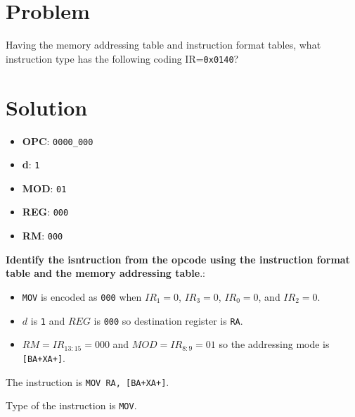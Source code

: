 \section*{Problem}
Having the memory addressing table and instruction format tables, what instruction type has the following coding IR=\texttt{0x0140}?

\section*{Solution}


\begin{itemize}
    \item \textbf{OPC}: \texttt{0000\_000}
    \item \textbf{d}: \texttt{1}
    \item \textbf{MOD}: \texttt{01}
    \item \textbf{REG}: \texttt{000}
    \item \textbf{RM}: \texttt{000}
\end{itemize}


\textbf{Identify the isntruction from the opcode using the instruction format table and the memory addressing table}.:
\begin{itemize}
    \item \texttt{MOV} is encoded as \texttt{000} when $IR_{1}=0$, $IR_{3}=0$, $IR_{0}=0$, and $IR_{2}=0$.
    \item $d$ is \texttt{1} and $REG$ is \texttt{000} so destination register is \texttt{RA}.
    \item $RM=IR_{13:15}=000$ and $MOD=IR_{8:9}=01$ so the addressing mode is \texttt{[BA+XA+]}.
\end{itemize}

The instruction is \texttt{MOV RA, [BA+XA+]}.

Type of the instruction is \texttt{MOV}.